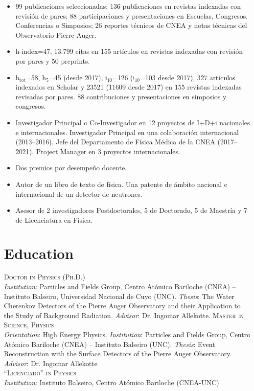 \begin{itemize}
    \item {} 99 publicaciones seleccionadas; 136 publicaciones en revistas indexadas con revisión de pares; 88 participaciones y presentaciones en Escuelas, Congresos, Conferencias o Simposios; 26 reportes técnicos de CNEA y notas técnicas del Observatorio Pierre Auger.
    \item {} h-index=47, 13.799 citas en 155 artículos en revistas indexadas con revisión por pares y 50 preprints.
    \item {} h$_{\text{tot}}$=58, h$_5$=45 (desde 2017), i$_{10}$=126 (i$_{10}$=103 desde 2017), 327 artículos indexados en Scholar y 23521 (11609 desde 2017) en 155 revistas indexadas revisadas por pares. 88 contribuciones y presentaciones en simposios y congresos.
    \item {} Investigador Principal o Co-Investigador en 12 proyectos de I+D+i nacionales e internacionales. Investigador Principal en una colaboración internacional (2013--2016). Jefe del Departamento de Física Médica de la CNEA (2017--2021). Project Manager en 3 proyectos internacionales.
    \item {} Dos premios por desempeño docente.
    \item {} Autor de un libro de texto de física. Una patente de ámbito nacional e internacional de un detector de neutrones.
    \item {} Asesor de 2 investigadores Postdoctorales, 5 de Doctorado, 5 de Maestría y 7 de Licenciatura en Física.
\end{itemize}
\fi

\ifeng
\section*{Education}
\noindent
{}\textsc{Doctor in Physics (Ph.D.)}\\
{\emph{Institution}}: Particles and Fields Group, Centro Atómico Bariloche (CNEA) -- Instituto Balseiro, Universidad Nacional de Cuyo (UNC). {\emph{Thesis}}: The Water Cherenkov Detectors of the Pierre Auger Observatory and their Application to the Study of Background Radiation. {\emph{Advisor}}: Dr. Ingomar Allekotte.
\textsc{Master in Science, Physics}\\
{\emph{Orientation}}: High Energy Physics. {\emph{Institution}}: Particles and Fields Group, Centro Atómico Bariloche (CNEA) -- Instituto Balseiro (UNC). {\emph{Thesis}}: Event Reconstruction with the Surface Detectors of the Pierre Auger Observatory. {\emph{Advisor}}: Dr. Ingomar Allekotte\\
\textsc{``Licenciado'' in Physics}\\
{\emph{Institution}}: Instituto Balseiro, Centro Atómico Bariloche (CNEA-UNC)\\
\else
